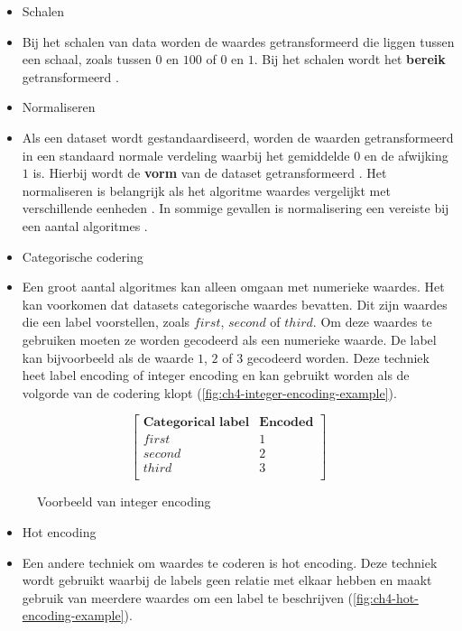 \begin{itemize}
  \item Schalen
  \item[] Bij het schalen van data worden de waardes getransformeerd die liggen tussen een schaal, zoals tussen \(0\) en \(100\) of \(0\) en \(1\). Bij het schalen wordt het \textbf{bereik} getransformeerd \cite{scale-and-normalize-data}. 
  \item Normaliseren
  \item[] Als een dataset wordt gestandaardiseerd, worden de waarden getransformeerd in een standaard normale verdeling waarbij het gemiddelde \(0\) en de afwijking \(1\) is. Hierbij wordt de \textbf{vorm} van de dataset getransformeerd \cite{scale-and-normalize-data}. Het normaliseren is belangrijk als het algoritme waardes vergelijkt met verschillende eenheden \cite{feature-scaling-normalization}. In sommige gevallen is normalisering een vereiste bij een aantal algoritmes \cite{data-transformation-standardization-vs-normalization}.
  \item Categorische codering
  \item[] Een groot aantal algoritmes kan alleen omgaan met numerieke waardes. Het kan voorkomen dat datasets categorische waardes bevatten. Dit zijn waardes die een label voorstellen, zoals \(first\), \(second\) of \(third\). Om deze waardes te gebruiken moeten ze worden gecodeerd als een numerieke waarde. De label kan bijvoorbeeld als de waarde \(1\), \(2\) of \(3\) gecodeerd worden. Deze techniek heet label encoding of integer encoding en kan gebruikt worden als de volgorde van de codering klopt (\autoref{fig:ch4-integer-encoding-example}).
\end{itemize}

\begin{figure}[hbt!]
  \centering
  $$\begin{bmatrix}
    \textbf{Categorical label} & \textbf{Encoded} \\
    first & 1 \\
    second & 2 \\
    third & 3 \\
  \end{bmatrix}$$
  \label{fig:ch4-integer-encoding-example}
  \caption{Voorbeeld van integer encoding}
\end{figure}

\begin{itemize}
  \item Hot encoding
  \item[] Een andere techniek om waardes te coderen is hot encoding. Deze techniek wordt gebruikt waarbij de labels geen relatie met elkaar hebben en maakt gebruik van meerdere waardes om een label te beschrijven (\autoref{fig:ch4-hot-encoding-example}).
\end{itemize}

